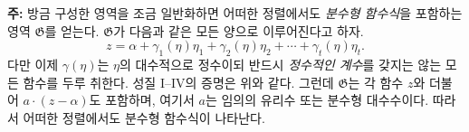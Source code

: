 
\textbf{주:} 방금 구성한 영역을 조금 일반화하면 어떠한 정렬에서도 \emph{분수형 함수식}을 포함하는 영역 $\mathfrak G$를 얻는다. $\mathfrak G$가 다음과 같은 모든 양으로 이루어진다고 하자.
\[
 z=\alpha+\gamma_1(\eta)\eta_1+\gamma_2(\eta)\eta_2
      +\cdots+\gamma_t(\eta)\eta_t.
\]
다만 이제 $\gamma(\eta)$는 $\eta$의 대수적으로 정수이되 반드시 \emph{정수적인 계수}를 갖지는 않는 모든 함수를 두루 취한다. 성질 I--IV의 증명은 위와 같다. 그런데 $\mathfrak G$는 각 함수 $z$와 더불어 $a\cdot(z-\alpha)$도 포함하며, 여기서 $a$는 임의의 유리수 또는 분수형 대수수이다. 따라서 어떠한 정렬에서도 분수형 함수식이 나타난다.
